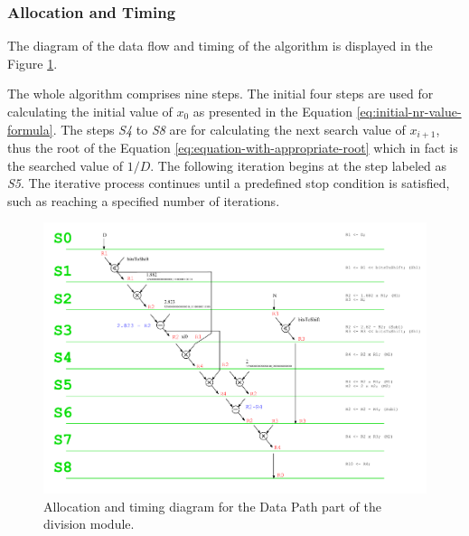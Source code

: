 \documentclass[a4paper, twoside, 11pt]{article}
\newcommand{\fbar}{\FloatBarrier}
\begin{document}
\subsubsection{Allocation and Timing}\label{subsubsec:division-allocation-and-timing}
The diagram of the data flow and timing of the algorithm is displayed in the Figure \ref{fig:division-allocation-timing}.\par
The whole algorithm comprises nine steps. The initial four steps are used for calculating the initial value of $x_0$ as presented in the Equation \ref{eq:initial-nr-value-formula}. The steps \textit{S4} to \textit{S8} are for calculating the next search value of $x_{i+1}$, thus the root of the Equation \ref{eq:equation-with-appropriate-root} which in fact is the searched value of $1/D$. The following iteration begins at the step labeled as \textit{S5}. The iterative process continues until a predefined stop condition is satisfied, such as reaching a specified number of iterations.
\begin{figure}[htbp!]
  \centering
  \includegraphics[width=1\textwidth]{src/pdf/allocation-timing.pdf}
   \caption{Allocation and timing diagram for the Data Path part of the division module.}
  \label{fig:division-allocation-timing}
\end{figure}

\fbar
\end{document}
